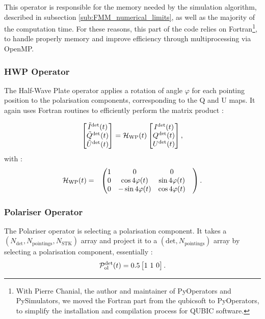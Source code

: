 \documentclass[../../thesis.tex]{subfiles}
\begin{document}
This operator is responsible for the memory needed by the simulation algorithm, described in subsection \ref{sub:FMM_numerical_limits}, as well as the majority of the computation time. For these reasons, this part of the code relies on Fortran\footnote{With Pierre Chanial, the author and maintainer of PyOperators and PySimulators, we moved the Fortran part from the qubicsoft to PyOperators, to simplify the installation and compilation process for QUBIC software.}, to handle properly memory and improve efficiency through multiprocessing via OpenMP.


\subsubsection{HWP Operator}

The Half-Wave Plate operator applies a rotation of angle $\varphi$ for each pointing position to the polarisation components, corresponding to the Q and U maps. It again uses Fortran routines to efficiently perform the matrix product : 

\begin{eqnarray}
\begin{bmatrix}  \tilde{I}^{\rm det}(t) \\ \tilde{Q}^{\rm det}(t) \\ \tilde{U}^{\rm det}(t) \end{bmatrix}= {\cal H}_{\rm WP}(t) \begin{bmatrix}  I^{\rm det}(t) \\ Q^{\rm det}(t) \\ U^{\rm det}(t) \end{bmatrix},
\end{eqnarray}
with :
\begin{eqnarray}
{\cal H}_{\rm WP}(t) &=&
\begin{pmatrix} 
1 & 
0 & 
0 & 
\cr
0 & 
\cos 4\varphi(t)& 
\sin 4\varphi(t)& 
  \cr
0 & 
-\sin 4\varphi(t) & 
\cos 4\varphi(t)& 
\cr
\end{pmatrix}.
\end{eqnarray}

\subsubsection{Polariser Operator}

The Polariser operator is selecting a polarisation component. It takes a $(N_{\text{det}}, N_{\text{pointings}}, N_{\text{STK}})$ array and project it to a $(\text{det}, N_{\text{pointings}})$ array by selecting a polarisation component, essentially :
\begin{eqnarray}
{\cal P}^{\rm det}_{\rm ol} (t)= 0.5 \begin{bmatrix} 1 \ 1 \ 0 \end{bmatrix}.
\end{eqnarray}
\end{document}
